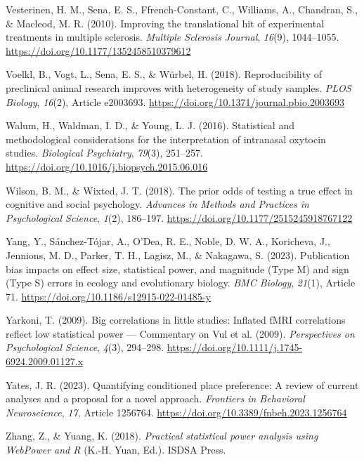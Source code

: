 \documentclass[authordate, meta, issue]{jote-new-article}
\begin{document}
	Vesterinen, H. M., Sena, E. S., Ffrench-Constant, C., Williams, A., Chandran, S., \& Macleod, M. R. (2010). Improving the translational hit of experimental treatments in multiple sclerosis. \emph{Multiple Sclerosis Journal}, \emph{16}(9), 1044--1055. \url{https://doi.org/10.1177/1352458510379612}



	Voelkl, B., Vogt, L., Sena, E. S., \& Würbel, H. (2018). Reproducibility of preclinical animal research improves with heterogeneity of study samples. \emph{PLOS Biology}, \emph{16}(2), Article e2003693. \url{https://doi.org/10.1371/journal.pbio.2003693}



	Walum, H., Waldman, I. D., \& Young, L. J. (2016). Statistical and methodological considerations for the interpretation of intranasal oxytocin studies. \emph{Biological Psychiatry}, \emph{79}(3), 251--257. \url{https://doi.org/10.1016/j.biopsych.2015.06.016}



	Wilson, B. M., \& Wixted, J. T. (2018). The prior odds of testing a true effect in cognitive and social psychology. \emph{Advances in Methods and Practices in Psychological Science}, \emph{1}(2), 186--197. \url{https://doi.org/10.1177/2515245918767122}



	Yang, Y., Sánchez-Tójar, A., O'Dea, R. E., Noble, D. W. A., Koricheva, J., Jennions, M. D., Parker, T. H., Lagisz, M., \& Nakagawa, S. (2023). Publication bias impacts on effect size, statistical power, and magnitude (Type M) and sign (Type S) errors in ecology and evolutionary biology. \emph{BMC Biology}, \emph{21}(1), Article 71. \url{https://doi.org/10.1186/s12915-022-01485-y}



	Yarkoni, T. (2009). Big correlations in little studies: Inflated fMRI correlations reflect low statistical power — Commentary on Vul et al. (2009). \emph{Perspectives on Psychological Science}, \emph{4}(3), 294--298. \url{https://doi.org/10.1111/j.1745-6924.2009.01127.x}



	Yates, J. R. (2023). Quantifying conditioned place preference: A review of current analyses and a proposal for a novel approach. \emph{Frontiers in Behavioral Neuroscience}, \emph{17, }Article 1256764. \url{https://doi.org/10.3389/fnbeh.2023.1256764}



	Zhang, Z., \& Yuang, K. (2018). \emph{Practical statistical power analysis using WebPower and R} (K.-H. Yuan, Ed.). ISDSA Press.
\end{document}
